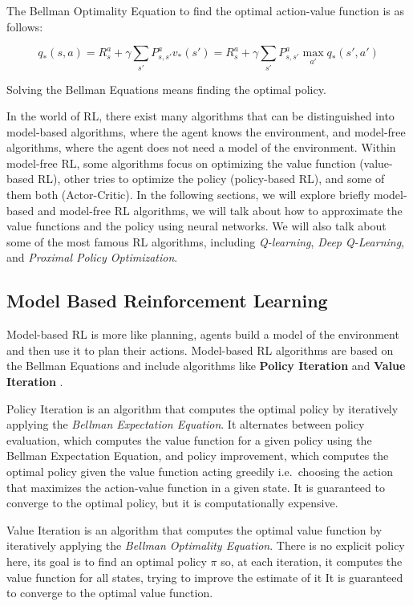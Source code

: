 The Bellman Optimality Equation to find the optimal action-value function is as follows:

\begin{equation} \label{eq:optimal_action_value}
    q_*(s, a) = R_s^a + \gamma \sum_{s'} P_{s, s'}^a v_*(s') = R_s^a + \gamma \sum_{s'} P_{s, s'}^a \max_{a'} q_*(s', a')
\end{equation}


Solving the Bellman Equations means finding the optimal policy.


In the world of RL, there exist many algorithms that can be distinguished into model-based algorithms, where the agent knows the environment, and model-free algorithms, where the agent does not need a model of the environment.
Within model-free RL, some algorithms focus on optimizing the value function (value-based RL), other tries to optimize the policy (policy-based RL), and some of them both (Actor-Critic).
In the following sections, we will explore briefly model-based and model-free RL algorithms, we will talk about how to approximate the value functions and the policy using neural networks.
We will also talk about some of the most famous RL algorithms, including \textit{Q-learning}, \textit{Deep Q-Learning}, and \textit{Proximal Policy Optimization}.


\subsection{Model Based Reinforcement Learning}
\label{subsec:model_based_rl}
Model-based RL is more like planning, agents build a model of the environment and then use it to plan their actions.
Model-based RL algorithms are based on the Bellman Equations and include algorithms like \textbf{Policy Iteration} \citep{howard1960dynamic} and \textbf{Value Iteration} \citep{bellman1966dynamic}.

Policy Iteration is an algorithm that computes the optimal policy by iteratively applying the \textit{Bellman Expectation Equation}.
It alternates between policy evaluation, which computes the value function for a given policy using the Bellman Expectation Equation, and policy improvement, which computes the optimal policy given the value function acting greedily i.e.\ choosing the action that maximizes the action-value function in a given state.
It is guaranteed to converge to the optimal policy, but it is computationally expensive.

Value Iteration is an algorithm that computes the optimal value function by iteratively applying the \textit{Bellman Optimality Equation}.
There is no explicit policy here, its goal is to find an optimal policy $\pi$ so, at each iteration, it computes the value function for all states, trying to improve the estimate of it 
It is guaranteed to converge to the optimal value function.

